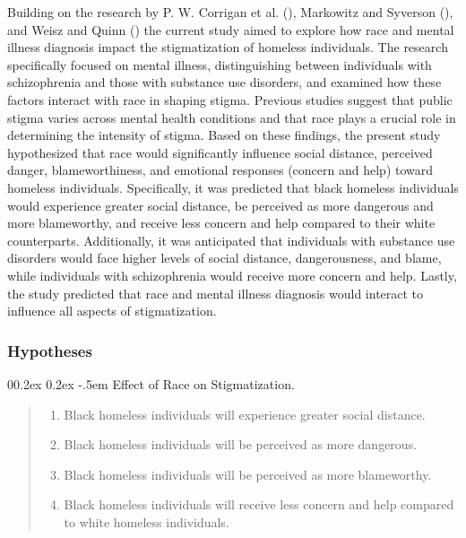 \documentclass[
  man,
  floatsintext,
  longtable,
  nolmodern,
  notxfonts,
  notimes,
  colorlinks=true,linkcolor=blue,citecolor=blue,urlcolor=blue]{apa7}
\makeatletter
\renewcommand{\paragraph}{\@startsection{paragraph}{4}{\parindent}%
	{0\baselineskip \@plus 0.2ex \@minus 0.2ex}%
	{-.5em}%
	{\normalfont\normalsize\bfseries\typesectitle}}
\providecommand{\tightlist}{%
  \setlength{\itemsep}{0pt}\setlength{\parskip}{0pt}}
\makeatother
\begin{document}
Building on the research by P. W. Corrigan et al.
(), Markowitz and
Syverson (), and
Weisz and Quinn
() the
current study aimed to explore how race and mental illness diagnosis
impact the stigmatization of homeless individuals. The research
specifically focused on mental illness, distinguishing between
individuals with schizophrenia and those with substance use disorders,
and examined how these factors interact with race in shaping stigma.
Previous studies suggest that public stigma varies across mental health
conditions and that race plays a crucial role in determining the
intensity of stigma. Based on these findings, the present study
hypothesized that race would significantly influence social distance,
perceived danger, blameworthiness, and emotional responses (concern and
help) toward homeless individuals. Specifically, it was predicted that
black homeless individuals would experience greater social distance, be
perceived as more dangerous and more blameworthy, and receive less
concern and help compared to their white counterparts. Additionally, it
was anticipated that individuals with substance use disorders would face
higher levels of social distance, dangerousness, and blame, while
individuals with schizophrenia would receive more concern and help.
Lastly, the study predicted that race and mental illness diagnosis would
interact to influence all aspects of stigmatization.

\subsubsection{Hypotheses}\label{hypotheses}

\paragraph{Effect of Race on
Stigmatization.}\label{effect-of-race-on-stigmatization}

\begin{quote}
\begin{enumerate}
\def\labelenumi{\arabic{enumi}.}
\tightlist
\item
  Black homeless individuals will experience greater social distance.
\item
  Black homeless individuals will be perceived as more dangerous.
\item
  Black homeless individuals will be perceived as more blameworthy.
\item
  Black homeless individuals will receive less concern and help compared
  to white homeless individuals.
\end{enumerate}
\end{quote}
\end{document}
